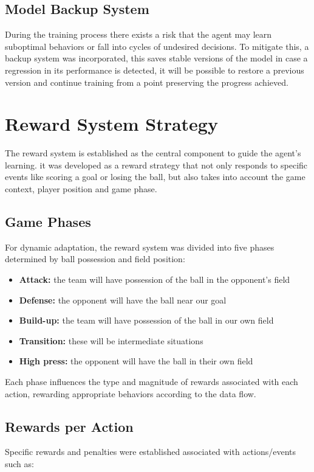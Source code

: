 \documentclass[conference]{IEEEtran}
\begin{document}
\subsection{Model Backup System}
During the training process there exists a risk that the agent may learn suboptimal behaviors or fall into cycles of undesired decisions. To mitigate this, a backup system was incorporated, this saves stable versions of the model in case a regression in its performance is detected, it will be possible to restore a previous version and continue training from a point preserving the progress achieved.

\section{Reward System Strategy}
The reward system is established as the central component to guide the agent's learning. it was developed as a reward strategy that not only responds to specific events like scoring a goal or losing the ball, but also takes into account the game context, player position and game phase.

\subsection{Game Phases}
For dynamic adaptation, the reward system was divided into five phases determined by ball possession and field position:

\begin{itemize}
  \item \textbf{Attack:} the team will have possession of the ball in the opponent's field
  \item \textbf{Defense:} the opponent will have the ball near our goal
  \item \textbf{Build-up:} the team will have possession of the ball in our own field
  \item \textbf{Transition:} these will be intermediate situations
  \item \textbf{High press:} the opponent will have the ball in their own field
\end{itemize}

Each phase influences the type and magnitude of rewards associated with each action, rewarding appropriate behaviors according to the data flow.

\subsection{Rewards per Action}
Specific rewards and penalties were established associated with actions/events such as:
\end{document}
